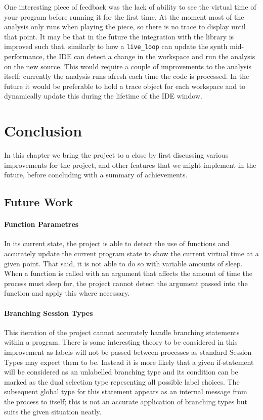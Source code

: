 \documentclass[11pt, abstracton, twoside, titlepage=true]{scrartcl}
\begin{document}
One interesting piece of 
feedback was the lack of ability to see the virtual time of your program before 
running it for the first time. At the moment most of the analysis only runs 
when playing the piece, so there is no trace to display until that point. It may 
be that in the future the integration with the library is improved such that, 
similarly to how a \texttt{live\_loop} can update the synth mid-performance,
the IDE can detect a change in the workspace and run the analysis on the new source. 
This would require a couple of improvements to the analysis itself; currently the 
analysis runs afresh each time the code is processed. In the future it would be
preferable to hold a trace object for each workspace and to dynamically update 
this during the lifetime of the IDE window. 



\newpage

\section{Conclusion}
\thispagestyle{empty}
In this chapter we bring the project to a close by first discussing various 
improvements for the project, and other features that we might implement 
in the future, before concluding with a summary of achievements. 

\subsection{Future Work}
\paragraph{Function Parametres}
In its current state, the project is able to detect the use of functions
and accurately update the current program state to show the current virtual
time at a given point. That said, it is not able to do so with variable
amounts of sleep. When a function is called with an argument that affects the
amount of time the process must sleep for, the project cannot detect the
argument passed into the function and apply this where necessary.

\paragraph{Branching Session Types}
This iteration of the project cannot accurately handle branching statements 
within a program. There is some interesting theory to be considered in this
improvement as labels will not be passed between processes as standard Session
Types may expect them to be. Instead it is more likely that a given if-statement
will be considered as an unlabelled branching type and its condition
can be marked as the dual selection type repesenting all possible label choices.
The subsequent global type for this statement appears as an internal message
from the process to itself; this is not an accurate application of branching
types but suits the given situation neatly.
\end{document}
